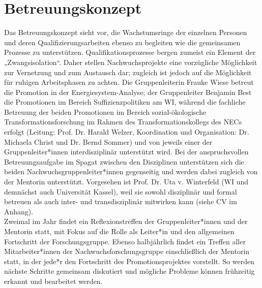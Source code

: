 \documentclass[a4paper,11pt,twoside]{scrartcl}
\begin{document}
\section{Betreuungskonzept}

Das Betreuungskonzept sieht vor, die Wachstumsringe der einzelnen Personen und deren Qualifizierungsarbeiten ebenso zu begleiten wie die gemeinsamen Prozesse zu unterstützen. Qualifikationsprozesse bergen zumeist ein Element der „Zwangsisolation“. Daher stellen Nachwuchsprojekte eine vorzügliche Möglichkeit zur Vernetzung und zum Austausch dar; zugleich ist jedoch auf die Möglichkeit für ruhigen Arbeitsphasen zu achten.
Die Gruppenleiterin Frauke Wiese betreut die Promotion in der Energiesystem-Analyse; der Gruppenleiter Benjamin Best die Promotionen im Bereich Suffizienzpolitiken am WI, während die fachliche Betreuung der beiden Promotionen im Bereich sozial-ökologische Transformationsforschung im Rahmen des Transformationskollegs des NECs erfolgt (Leitung: Prof. Dr. Harald Welzer, Koordination und Organisation: Dr. Michaela Christ und Dr. Bernd Sommer) und von jeweils einer der Gruppenleiter*innen interdisziplinär unterstützt wird. Bei der anspruchsvollen Betreuungsaufgabe im Spagat zwischen den Disziplinen unterstützen sich die beiden Nachwuchsgruppenleiter*innen gegenseitig und werden dabei zugleich von der Mentorin unterstützt. Vorgesehen ist Prof. Dr. Uta v. Winterfeld (WI und demnächst auch Universität Kassel), weil sie sowohl disziplinär und formal betreuen als auch inter- und transdisziplinär mitwirken kann (siehe CV im Anhang).\\
Zweimal im Jahr findet ein Reflexionstreffen der Gruppenleiter*innen und der Mentorin statt, mit Fokus auf die Rolle als Leiter*in und den allgemeinen Fortschritt der Forschungsgruppe. Ebenso halbjährlich findet ein Treffen aller Mitarbeiter*innen der Nachwuchsforschungsgruppe einschließlich der Mentorin statt, in der jede*r den Fortschritt des Promotionsprojektes vorstellt. So werden nächste Schritte gemeinsam diskutiert und mögliche Probleme können frühzeitig erkannt und bearbeitet werden.\\
\end{document}
